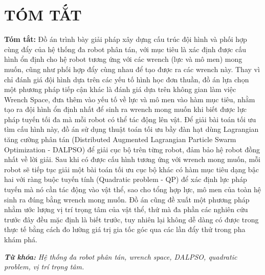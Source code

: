 \chapter*{TÓM TẮT}
\fontsize{13}{15}\selectfont

\textbf{Tóm tắt:} Đồ án trình bày giải pháp xây dựng cấu trúc đội hình và phối hợp cùng đẩy của hệ thống đa robot phân tán, với mục tiêu là xác định được cấu hình ổn định cho hệ robot tương ứng với các wrench (lực và mô men) mong muốn, cũng như phối hợp đẩy cùng nhau để tạo được ra các wrench này. Thay vì chỉ đánh giá đội hình dựa trên các yếu tố hình học đơn thuần, đồ án lựa chọn một phương pháp tiếp cận khác là đánh giá dựa trên không gian làm việc Wrench Space, đưa thêm vào yếu tố về lực và mô men vào hàm mục tiêu, nhằm tạo ra đội hình ổn định nhất để sinh ra wrench mong muốn khi biết được lực pháp tuyến tối đa mà mỗi robot có thể tác động lên vật. Để giải bài toán tối ưu tìm cấu hình này, đồ án sử dụng thuật toán tối ưu bầy đàn hạt dùng Lagrangian tăng cường phân tán (Distributed Augmented Lagrangian Particle Swarm Optimization - DALPSO) để giải cục bộ trên từng robot, đảm bảo hệ robot đồng nhất về lời giải. Sau khi có được cấu hình tương ứng với wrench mong muốn, mỗi robot sẽ tiếp tục giải một bài toán tối ưu cục bộ khác có hàm mục tiêu dạng bậc hai với ràng buộc tuyến tính (Quadratic problem - QP) để xác định lực pháp tuyến mà nó cần tác động vào vật thể, sao cho tổng hợp lực, mô men của toàn hệ sinh ra đúng bằng wrench mong muốn. Đồ án cũng đề xuất một phương pháp nhằm ước lượng vị trí trọng tâm của vật thể, thứ mà đa phần các nghiên cứu trước đây đều mặc định là biết trước, tuy nhiên lại không dễ dàng có được trong thực tế bằng cách đo lường giá trị gia tốc góc qua các lần đẩy thử trong pha khám phá. 

\textbf{\textit{Từ khóa: }} \textit{Hệ thống đa robot phân tán, wrench space, DALPSO, quadratic problem, vị trí trọng
tâm.}